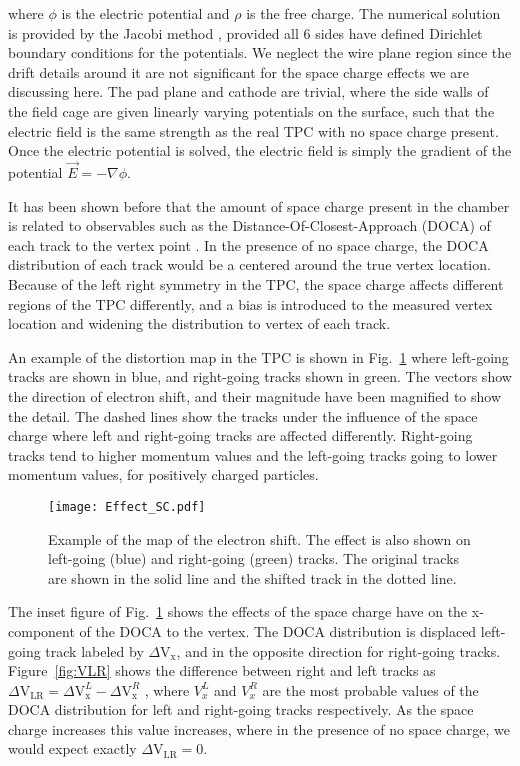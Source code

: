  where $\phi$ is the electric potential and $\rho$ is the free charge. The numerical solution is provided by the Jacobi method \cite{poisson}, provided all 6 sides have defined Dirichlet boundary conditions for the potentials. We neglect the wire plane region since the drift details around it are not significant for the space charge effects we are discussing here. The pad plane and cathode are trivial, where the side walls of the field cage are given linearly varying potentials on the surface, such that the electric field is the same strength as the real TPC with no space charge present. Once the electric potential is solved, the electric field is simply the gradient of the potential  $\vec{E}= -\nabla \phi$. 
 
It has been shown before that the amount of space charge present in the chamber is related to observables such as the Distance-Of-Closest-Approach (DOCA) of each track to the vertex point \cite{starSC}. In the presence of no space charge, the DOCA distribution of each track would be a centered around the true vertex location. Because of the left right symmetry in the TPC, the space charge affects different regions of the TPC differently, and a bias is introduced to the measured vertex location and widening the distribution to vertex of each track.  

An example of the distortion map in the TPC is shown in Fig.~\ref{fig:sc_shift} where left-going tracks are shown in blue, and right-going tracks shown in green. The vectors show the direction of electron shift, and their magnitude have been magnified to show the detail. The dashed lines show the tracks under the influence of the space charge where left and right-going tracks are affected differently. Right-going tracks tend to higher momentum values and the left-going tracks going to lower momentum values, for positively charged particles.  
 

\begin{figure}[!htb]
\centering
\texttt{[image: Effect\_SC.pdf]}
\caption{Example of the map of the electron shift. The effect is also shown on left-going (blue) and right-going (green) tracks. The original tracks are shown in the solid line and the shifted track in the dotted line.}
\label{fig:sc_shift}
\end{figure}

The inset figure of Fig.~\ref{fig:sc_shift} shows the effects of the space charge have on the x-component of the DOCA to the vertex. The DOCA distribution is displaced left-going track labeled by $\Delta\mathrm{V}_\mathrm{x}$, and in the opposite direction for right-going tracks. Figure~\ref{fig:VLR} shows the difference between right and left tracks as $\Delta\mathrm{V}_\mathrm{LR} = \Delta\mathrm{V}_\mathrm{x}^L - \Delta\mathrm{V}_\mathrm{x}^R$ , where  $V_x^L$ and $V_x^R$ are the most probable values of the DOCA distribution for left and right-going tracks respectively. As the space charge increases this value increases, where in the presence of no space charge, we would expect exactly $\Delta\mathrm{V}_\mathrm{LR} = 0$. 

